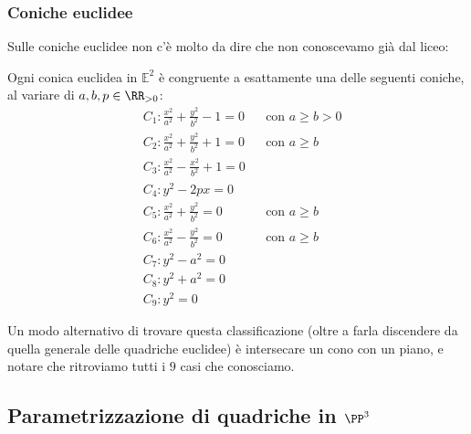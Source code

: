 \documentclass[11pt]{scrartcl}
\begin{document}
	\subsubsection{Coniche euclidee}
	Sulle coniche euclidee non c'è molto da dire che non conoscevamo già dal liceo:
	\begin{theorem}
		Ogni conica euclidea in $\mathbb{E}^2$ è congruente a esattamente una delle seguenti coniche, al variare di $a,b,p\in \RR_{>0}$:
		\begin{align*}
			& C_1:\frac{x^2}{a^2}+\frac{y^2}{b^2}-1=0 && \text{con $a\ge b >0$} \\
			& C_2:\frac{x^2}{a^2}+\frac{y^2}{b^2}+1=0 && \text{con $a\ge b$} \\
			& C_3:\frac{x^2}{a^2}-\frac{x^2}{b^2}+1=0  &&
			\\
			& C_4:y^2-2px=0 && \\
			& C_5:\frac{x^2}{a^2}+\frac{y^2}{b^2}=0 && \text{con $a\ge b$} \\
			& C_6:\frac{x^2}{a^2}-\frac{y^2}{b^2}=0 && \text{con $a\ge b$} \\
			& C_7:y^2-a^2=0 &&  \\
			& C_8:y^2+a^2=0 &&  \\
			& C_9:y^2=0 && 
		\end{align*}
	\end{theorem}
	Un modo alternativo di trovare questa classificazione (oltre a farla discendere da quella generale delle quadriche euclidee) è intersecare un cono con un piano, e notare che ritroviamo tutti i $9$ casi che conosciamo.
	
	\subsection{Parametrizzazione di quadriche in $\PP^3$}
	
\end{document}
